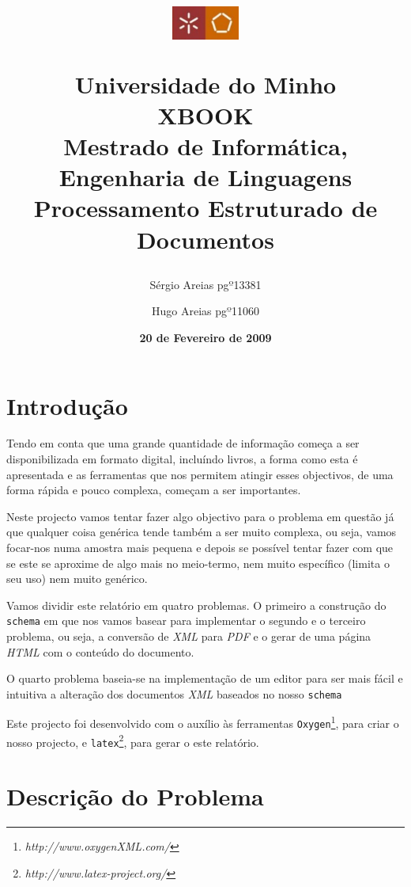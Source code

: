 \documentclass[a4paper]{article}
\title{\huge  \\ \bigskip
\begin{figure}[!ht]
\begin{center}
\includegraphics[width=0.2\textwidth]{./Images/um-eng.jpg}
\end{center}
\end{figure}
{\small Universidade do Minho}\\
{\vspace{2cm} \Huge \textbf{XBOOK}}\\
{\vspace{1cm} \large Mestrado de Informática, Engenharia de Linguagens}\\
{\large Processamento Estruturado de Documentos}\\
}
\date{\vspace{4cm} \LARGE \textbf{20 de Fevereiro de 2009}}
\author{\large Sérgio Areias pg$º$13381 \and \large Hugo Areias pg$º$11060}
\begin{document}
\maketitle
\newpage
\large \tableofcontents
{}

\newpage
\section{\LARGE Introdução}

\hspace{1cm}Tendo em conta que uma grande quantidade de informação começa a ser disponibilizada em formato digital, incluíndo livros, a forma como esta é apresentada e as ferramentas que nos permitem atingir esses objectivos, de uma forma rápida e pouco complexa, começam a ser importantes.

\hspace{1cm}Neste projecto vamos tentar fazer algo objectivo para o problema em questão já que qualquer coisa genérica tende também a ser muito complexa, ou seja, vamos focar-nos numa amostra mais pequena e depois se possível tentar fazer com que se este se aproxime de algo mais no meio-termo, nem muito específico (limita o seu uso) nem muito genérico.

\hspace{1cm}Vamos dividir este relatório em quatro problemas. O primeiro a construção do \verb|schema| em que nos vamos basear para implementar o segundo e o terceiro problema, ou seja, a conversão de {\em XML} para {\em PDF} e o gerar de uma página {\em HTML} com o conteúdo do documento.

\hspace{1cm}O quarto problema baseia-se na implementação de um editor para ser mais fácil e intuitiva a alteração dos documentos {\em XML} baseados no nosso \verb|schema|

\hspace{1cm}Este projecto foi desenvolvido com o auxílio às ferramentas \verb|Oxygen|\footnote{{\em http://www.oxygenXML.com/}}, para criar o nosso projecto, e \verb|latex|\footnote{{\em http://www.latex-project.org/}}, para gerar o este relatório.\\

\newpage
\section{\LARGE Descrição do Problema}
\end{document}
